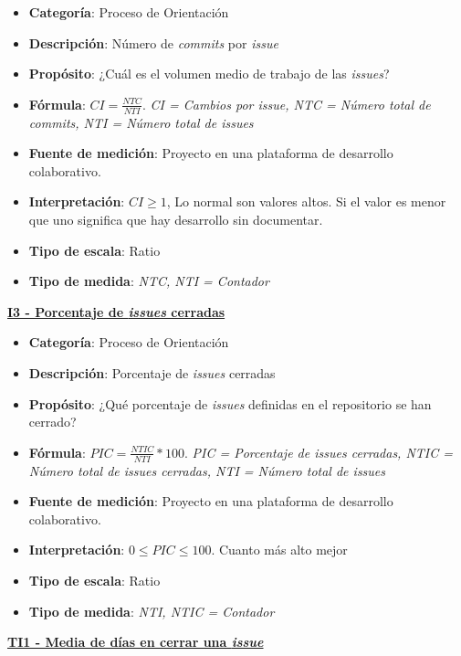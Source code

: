 \begin{itemize}
	\item \textbf{Categoría}: Proceso de Orientación
	\item \textbf{Descripción}: Número de \textit{commits} por \textit{issue}
	\item \textbf{Propósito}: ¿Cuál es el volumen medio de trabajo de las \textit{issues}?
	\item \textbf{Fórmula}: $CI = \frac{NTC}{NTI}$. \textit{CI = Cambios por \textit{issue}, NTC = Número total de \textit{commits}, NTI = Número total de \textit{issues}}
	\item \textbf{Fuente de medición}: Proyecto en una plataforma de desarrollo colaborativo.
	\item \textbf{Interpretación}: $CI \geq 1$, Lo normal son valores altos. Si el valor es menor que uno significa que hay desarrollo sin documentar.
	\item \textbf{Tipo de escala}: Ratio 
	\item \textbf{Tipo de medida}: \textit{NTC, NTI = Contador}
\end{itemize}

\textbf{\underline{I3 - Porcentaje de \textit{issues} cerradas}}

\begin{itemize}
	\item \textbf{Categoría}: Proceso de Orientación
	\item \textbf{Descripción}: Porcentaje de \textit{issues} cerradas
	\item \textbf{Propósito}: ¿Qué porcentaje de \textit{issues} definidas en el repositorio se han cerrado?
	\item \textbf{Fórmula}: $PIC = \frac{NTIC}{NTI}*100$. \textit{PIC = Porcentaje de \textit{issues} cerradas, NTIC = Número total de \textit{issues} cerradas, NTI = Número total de \textit{issues}}
	\item \textbf{Fuente de medición}: Proyecto en una plataforma de desarrollo colaborativo.
	\item \textbf{Interpretación}: $0 \leq PIC \leq 100$. Cuanto más alto mejor
	\item \textbf{Tipo de escala}: Ratio
	\item \textbf{Tipo de medida}: \textit{NTI, NTIC = Contador}
\end{itemize}

\textbf{\underline{TI1 - Media de días en cerrar una \textit{issue}}}

